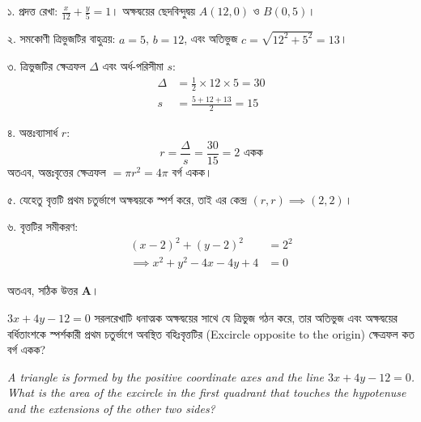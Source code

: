 \documentclass[12pt, a4paper]{article}
\begin{document}
\begin{tcolorbox}[solutionbox={সমাধান (Solution)}]
    \noindent
    ১. প্রদত্ত রেখা: $\frac{x}{12} + \frac{y}{5} = 1$। 
    অক্ষদ্বয়ের ছেদবিন্দুদ্বয় $A(12, 0)$ ও $B(0, 5)$। 
    
    ২. সমকোণী ত্রিভুজটির বাহুত্রয়: $a = 5$, $b = 12$, এবং অতিভুজ $c = \sqrt{12^2 + 5^2} = 13$। 
    
    ৩. ত্রিভুজটির ক্ষেত্রফল $\Delta$ এবং অর্ধ-পরিসীমা $s$:
    \begin{align*}
        \Delta &= \frac{1}{2} \times 12 \times 5 = 30 \\
        s &= \frac{5 + 12 + 13}{2} = 15
    \end{align*}
    
    ৪. অন্তঃব্যাসার্ধ $r$:
    \[ r = \frac{\Delta}{s} = \frac{30}{15} = 2 \text{ একক} \]
    অতএব, অন্তঃবৃত্তের ক্ষেত্রফল $= \pi r^2 = 4\pi$ বর্গ একক। 
    
    ৫. যেহেতু বৃত্তটি প্রথম চতুর্ভাগে অক্ষদ্বয়কে স্পর্শ করে, তাই এর কেন্দ্র $(r, r) \implies (2, 2)$। 
    
    ৬. বৃত্তটির সমীকরণ: 
    \begin{align*}
        (x - 2)^2 + (y - 2)^2 &= 2^2 \\
        \implies x^2 + y^2 - 4x - 4y + 4 &= 0
    \end{align*}
    
    অতএব, সঠিক উত্তর \textbf{A}।
\end{tcolorbox}

\vspace{2em}

\begin{tcolorbox}[questionbox={প্রশ্ন (Question) 45}]
    \noindent
    $3x + 4y - 12 = 0$ সরলরেখাটি ধনাত্মক অক্ষদ্বয়ের সাথে যে ত্রিভুজ গঠন করে, তার অতিভুজ এবং অক্ষদ্বয়ের বর্ধিতাংশকে স্পর্শকারী প্রথম চতুর্ভাগে অবস্থিত বহিঃবৃত্তটির (Excircle opposite to the origin) ক্ষেত্রফল কত বর্গ একক?
    
    \vspace{0.8em}
    \begin{english}
    \noindent\textit{\color{darkgray}
    A triangle is formed by the positive coordinate axes and the line $3x + 4y - 12 = 0$. What is the area of the excircle in the first quadrant that touches the hypotenuse and the extensions of the other two sides?
    }
    \end{english}
\end{tcolorbox}
\end{document}
